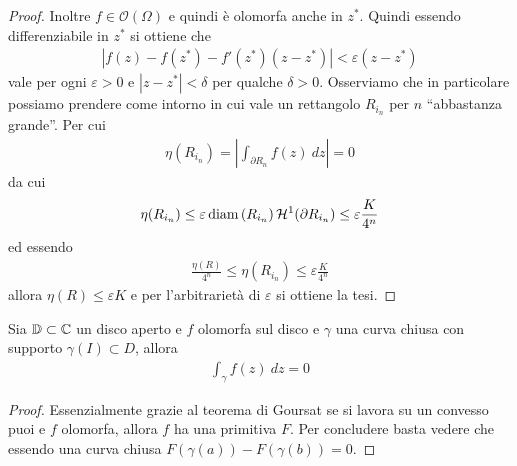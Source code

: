 \begin{proof}
	Inoltre $f \in \mathcal{O}(\Omega)$ e quindi è olomorfa anche in $z^*$. Quindi essendo differenziabile in $z^*$ si ottiene che 
	\begin{equation*}
	\begin{aligned}
		|f(z) - f(z^*) - f'(z^*)(z-z^*)| < \varepsilon(z - z^*)
	\end{aligned}
	\end{equation*}
	vale per ogni $\varepsilon > 0$ e $|z - z^*| < \delta$ per qualche $\delta > 0$. Osserviamo che in particolare possiamo prendere come intorno in cui vale un rettangolo $R_{i_n}$ per $n$ ``abbastanza grande''. Per cui
	\begin{equation*}
	\begin{aligned}
		\eta(R_{i_n}) = \left|\int_{\partial R_n} f(z)\ dz\right| = 0 %
	\end{aligned}
	\end{equation*}
	da cui 
	\begin{equation*}
	\begin{aligned}
		\eta(R_{i_n}) \le \varepsilon \operatorname{diam}\left(R_{i_n}\right) \mathcal{H}^1(\partial R_{i_n}) \le \varepsilon \frac{K}{4^n} 
	\end{aligned}
	\end{equation*}
	ed essendo
	\begin{equation*}
	\begin{aligned}
		\frac{\eta(R)}{4^n} \le \eta(R_{i_n}) \le \varepsilon \frac{K}{4^n}
	\end{aligned}
	\end{equation*}
	allora $\eta(R) \le \varepsilon K$ e per l'arbitrarietà di $\varepsilon$ si ottiene la tesi.
\end{proof}

\begin{theorem}
	\label{thr:cauchy-integrale}
	Sia $\mathbb{D} \subset \mathbb{C}$ un disco aperto e $f$ olomorfa sul disco e $\gamma$ una curva chiusa con supporto $\gamma(I) \subset D$, allora 
	\begin{equation*}
	\begin{aligned}
		\int_\gamma f(z)\ dz = 0
	\end{aligned}
	\end{equation*}
\end{theorem}
\begin{proof}
	Essenzialmente grazie al teorema di Goursat se si lavora su un convesso puoi e $f$ olomorfa, allora $f$ ha una primitiva $F$. Per concludere basta vedere che essendo una curva chiusa $F(\gamma(a)) - F(\gamma(b)) = 0$. 
\end{proof}

